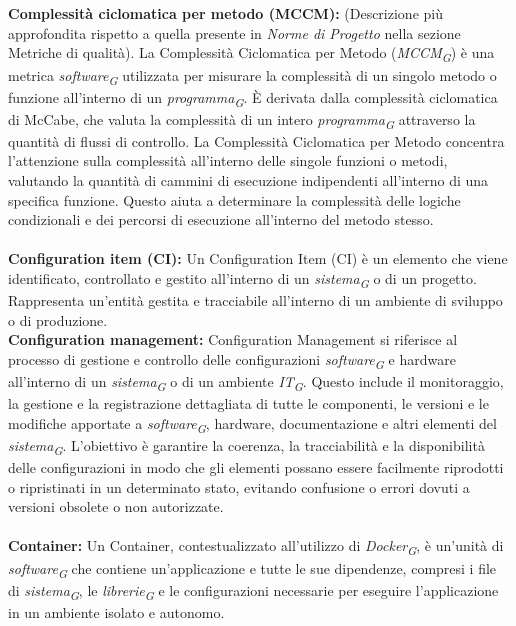 \documentclass{article}
\begin{document}
\\
\\
\textbf{Complessità ciclomatica per metodo (MCCM):} (Descrizione più approfondita rispetto a quella presente in \textit{Norme di Progetto} nella sezione Metriche di qualità). La Complessità Ciclomatica per Metodo (\textit{MCCM}\textsubscript{\textit{G}}) è una metrica \textit{software}\textsubscript{\textit{G}} utilizzata per misurare la complessità di un singolo metodo o funzione all'interno di un \textit{programma}\textsubscript{\textit{G}}. È derivata dalla complessità ciclomatica di McCabe, che valuta la complessità di un intero \textit{programma}\textsubscript{\textit{G}} attraverso la quantità di flussi di controllo.
La Complessità Ciclomatica per Metodo concentra l'attenzione sulla complessità all'interno delle singole funzioni o metodi, valutando la quantità di cammini di esecuzione indipendenti all'interno di una specifica funzione. Questo aiuta a determinare la complessità delle logiche condizionali e dei percorsi di esecuzione all'interno del metodo stesso.
\\
\\
\textbf{Configuration item (CI):} Un Configuration Item (CI) è un elemento che viene identificato, controllato e gestito all'interno di un \textit{sistema}\textsubscript{\textit{G}} o di un progetto. Rappresenta un'entità gestita e tracciabile all'interno di un ambiente di sviluppo o di produzione.
\pagebreak
\\
\textbf{Configuration management:} Configuration Management si riferisce al processo di gestione e controllo delle configurazioni \textit{software}\textsubscript{\textit{G}} e hardware all'interno di un \textit{sistema}\textsubscript{\textit{G}} o di un ambiente \textit{IT}\textsubscript{\textit{G}}. Questo include il monitoraggio, la gestione e la registrazione dettagliata di tutte le componenti, le versioni e le modifiche apportate a \textit{software}\textsubscript{\textit{G}}, hardware, documentazione e altri elementi del \textit{sistema}\textsubscript{\textit{G}}. L'obiettivo è garantire la coerenza, la tracciabilità e la disponibilità delle configurazioni in modo che gli elementi possano essere facilmente riprodotti o ripristinati in un determinato stato, evitando confusione o errori dovuti a versioni obsolete o non autorizzate.
\\
\\
\textbf{Container:} Un Container, contestualizzato all’utilizzo di \textit{Docker}\textsubscript{\textit{G}}, è un'unità di \textit{software}\textsubscript{\textit{G}} che contiene un'applicazione e tutte le sue dipendenze, compresi i file di \textit{sistema}\textsubscript{\textit{G}}, le \textit{librerie}\textsubscript{\textit{G}} e le configurazioni necessarie per eseguire l'applicazione in un ambiente isolato e autonomo.
\end{document}
